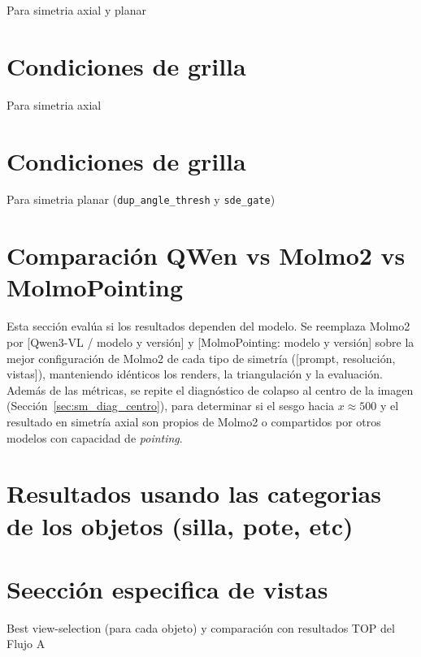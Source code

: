Para simetria axial y planar

\section{Condiciones de grilla}

Para simetria axial 

\section{Condiciones de grilla}

Para simetria planar (\texttt{dup\_angle\_thresh} y \texttt{sde\_gate})


\section{Comparación QWen vs Molmo2 vs MolmoPointing}

Esta sección evalúa si los resultados dependen del modelo. Se reemplaza Molmo2 por
[Qwen3-VL / modelo y versión] y [MolmoPointing: modelo y versión] sobre la mejor
configuración de Molmo2 de cada tipo de simetría ([prompt, resolución, vistas]),
manteniendo idénticos los renders, la triangulación y la evaluación. Además de las
métricas, se repite el diagnóstico de colapso al centro de la imagen
(Sección~\ref{sec:sm_diag_centro}), para determinar si el sesgo hacia
$x\approx500$ y el resultado en simetría axial son propios de Molmo2 o compartidos
por otros modelos con capacidad de \textit{pointing}.


\section{Resultados usando las categorias de los objetos (silla, pote, etc)}

\section{Seección especifica de vistas}

Best view-selection (para cada objeto) y comparación con resultados TOP del Flujo A

\newpage
